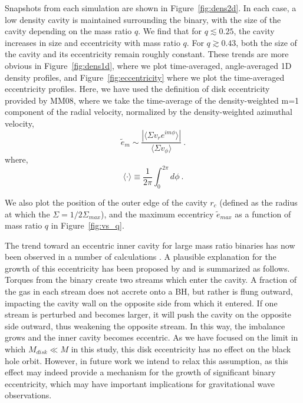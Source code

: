 \documentclass[apj]{emulateapj}
\begin{document}
Snapshots from each simulation are shown in Figure~\ref{fig:dens2d}. In each case, a low density cavity is maintained surrounding the binary, with the size of the cavity depending on the mass ratio $q$. We find that for $q\lesssim 0.25$, the cavity increases in size and eccentricity with mass ratio $q$. For $q\gtrsim 0.43$, both the size of the cavity and its eccentricity remain roughly constant.  These trends are more obvious in Figure~\ref{fig:dens1d}, where we plot time-averaged, angle-averaged 1D density profiles, and Figure~\ref{fig:eccentricity} where we plot the time-averaged eccentricity profiles. Here, we have used the definition of disk eccentricity provided by MM08, where we take the time-average of the density-weighted m=1 component of the radial velocity, normalized by the density-weighted azimuthal velocity,
\begin{equation}
\tilde{e}_m \sim \frac{| \langle \Sigma v_r e^{im\phi}\rangle|}{\langle\Sigma v_{\phi}\rangle} \ .
\end{equation}
where, 
\begin{equation}
  \langle \cdot \rangle \equiv \frac{1}{2\pi}\int_0^{2 \pi} d \phi \ .
\end{equation}

We also plot the position of the outer edge of the cavity $r_c$ (defined as the radius at which the $\Sigma=1/2 \Sigma_{max}$), and the maximum eccentricy $\tilde{e}_{max}$ as a function of mass ratio $q$ in Figure~\ref{fig:vs_q}. 

The trend toward an eccentric inner cavity for large mass ratio binaries has now been observed in a number of calculations \citep{macfadyen08,dorazio13,shi12,noble12,farris12}. A plausible explanation for the growth of this eccentricity has been proposed by \citet{dorazio13} and is summarized as follows. Torques from the binary create two streams which enter the cavity. A fraction of the gas in each stream does not accrete onto a BH, but rather is flung outward, impacting the cavity wall on the opposite side from which it entered. If one stream is perturbed and becomes larger, it will push the cavity on the opposite side outward, thus weakening the opposite stream. In this way, the imbalance grows and the inner cavity becomes eccentric. As we have focused on the limit in which $M_{disk} \ll M$ in this study, this disk eccentricity has no effect on the black hole orbit. However, in future work we intend to relax this assumption, as this effect may indeed provide a mechanism for the growth of significant binary eccentricity, which may have important implications for gravitational wave observations. 
\end{document}
